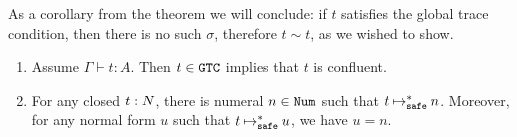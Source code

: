 As a corollary from the theorem we will conclude: 
if $t$ satisfies the global trace condition, then there is no such $\sigma$, therefore $t \sim t$, 
as we wished to show.

\begin{corollary}\label{cor:UniqueNF_typeN}
  \begin {enumerate}
  \item
    Assume $\Gamma\vdash t:A$. Then $t \in {\tt GTC}$ implies that $t$ is confluent. 
  \item
    For any closed $t:{N}$, there is numeral $n\in{\tt Num}$ such that $t\mathbin{\mathbin{\mapsto}_{\hbox{\scriptsize \tt safe}}^*} n$.
    Moreover, for any normal form $u$ such that $t \mathbin{\mathbin{\mapsto}_{\hbox{\scriptsize \tt safe}}^*} u$, we have $u=n$. 
  \end{enumerate}
\end{corollary}





